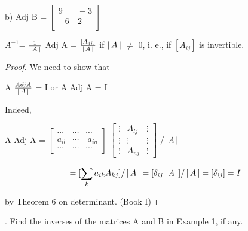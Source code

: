 \documentclass[11pt]{amsbook}
\begin{document}
b) Adj B =  $\begin{bmatrix} 
9 &\ -3 \\
-6 &\  2 \\
\end{bmatrix}$

\begin{thm} $A^{-1} $= $\frac{1}{\left \lvert \, A \, \right \rvert}$  Adj A = $\frac{[A_{ji}]}{\left \lvert \, A \, \right \rvert}$ if $\left \lvert \, A \, \right \rvert$ $\neq$ 0, i. e., if $[A_{ij}]$ is invertible.
\end{thm}
\begin{proof} We need to show that

\begin{center}
A $\frac{Adj A}{\left \lvert \, A \, \right \rvert}$ = I or A Adj A =  I 
\end{center}
Indeed,
\begin{center}
A Adj A = $\begin{bmatrix} 
\cdots &\cdots &\cdots \\
a_{il} &\cdots &\ a_{in} \\
\cdots &\cdots &\cdots
\end{bmatrix}$
$\begin{bmatrix} 
\vdots & A_{lj} &\vdots \\
\vdots &\vdots &\vdots \\
\vdots & A_{nj} &\vdots
\end{bmatrix}$ /$\left \lvert \, A \, \right \rvert$
\end{center}
\begin{center}
\[=[\sum_{\substack{k}} a_{ik} A_{kj}] /\left \lvert \, A \, \right \rvert = [\delta_{ij}\left \lvert \, A \, \right \rvert]/\left \lvert \, A \, \right \rvert= [\delta_{ij}] = I \]
\end{center}
by Theorem 6 on determinant. (Book I)
\end{proof}
\begin{exmp}. Find the inverses of the matrices A and B in Example 1, if any.
\end{exmp}
\end{document}
